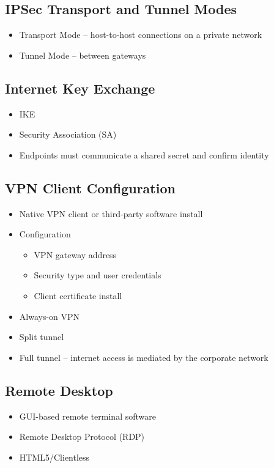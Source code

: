 	\subsection{IPSec Transport and Tunnel Modes}
		\begin{itemize}
			\item Transport Mode -- host-to-host connections on a private network
			\item Tunnel Mode -- between gateways
		\end{itemize}
	\subsection {Internet Key Exchange}
		\begin{itemize}
			\item IKE
			\item Security Association (SA)
			\item Endpoints must communicate a shared secret and confirm identity
		\end{itemize}
	\subsection {VPN Client Configuration}
		\begin{itemize}
			\item Native VPN client or third-party software install
			\item Configuration
				\begin{itemize}
					\item VPN gateway address
					\item Security type and user credentials
					\item Client certificate install
				\end{itemize}
			\item Always-on VPN
			\item Split tunnel
			\item Full tunnel -- internet access is mediated by the corporate network
		\end{itemize}
	\subsection {Remote Desktop}
		\begin{itemize}
			\item GUI-based remote terminal software
			\item Remote Desktop Protocol (RDP)
			\item HTML5/Clientless
		\end{itemize}
